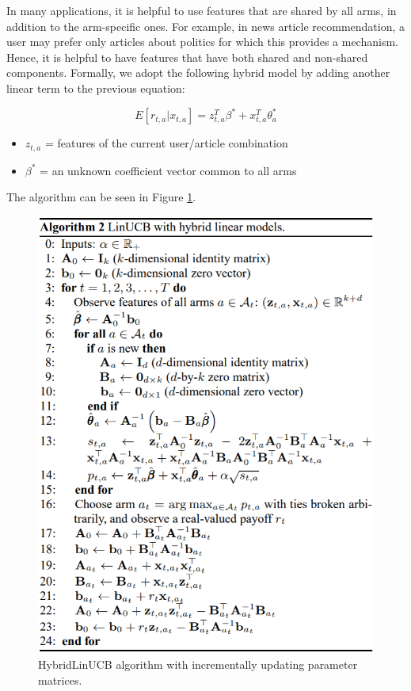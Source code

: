 \documentclass[12pt, titlepage]{article}
\begin{document}
In many applications, it is helpful to use features
that are shared by all arms, in addition to the arm-specific ones. For
example, in news article recommendation, a user may prefer only
articles about politics for which this provides a mechanism. Hence,
it is helpful to have features that have both shared and non-shared
components. Formally, we adopt the following hybrid model by
adding another linear term to the previous equation:

$$
E[r_{t,a}|x_{t,a}] = z^T_{t,a}\beta^* + x^T_{t,a}\theta^*_a 
$$

\begin{itemize}
\item $z_{t,a}$ = features of the current user/article combination
\item $\beta^*$ = an unknown coefficient vector common to all arms
\end{itemize}

The algorithm can be seen in Figure \ref{fig:HybridlinUCB_alg}.

\begin{figure}
 \centering
 \includegraphics[scale=0.9]{img/HybridLinUCB_alg}
 \caption{HybridLinUCB algorithm with incrementally updating parameter matrices.\cite{cit:paper}}
 \label{fig:HybridlinUCB_alg}
\end{figure}
\end{document}
